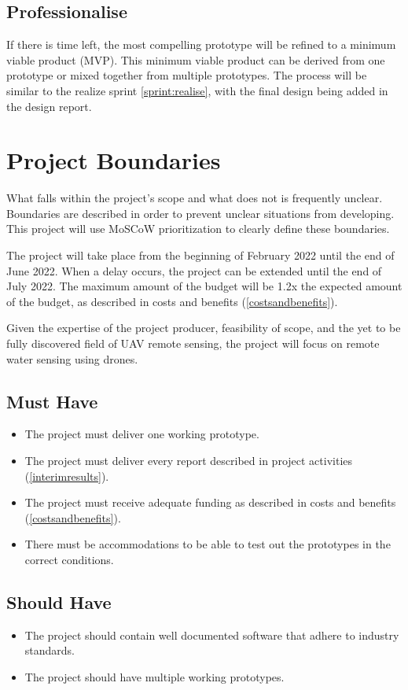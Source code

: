 \documentclass[11pt, a4paper]{article}
\begin{document}
\subsection{Professionalise} \label{sprint:professionalise}
If there is time left, the most compelling prototype will be refined to a minimum viable product (MVP). \cite{mvp} This minimum viable product can be derived from one prototype or mixed together from multiple prototypes. The process will be similar to the realize sprint \ref{sprint:realise}, with the final design being added in the design report.

\section{Project Boundaries} \label{projectboundaries}
What falls within the project’s scope and what does not is frequently  unclear. Boundaries are described in order to prevent unclear situations from developing. This project will use MoSCoW prioritization to clearly define these boundaries. \cite{moscow}

The project will take place from the beginning of February 2022 until the end of June 2022. When a delay occurs, the project can be extended until the end of July 2022. The maximum amount of the budget will be 1.2x the expected amount of the budget, as described in costs and benefits (\ref{costsandbenefits}). 

Given the expertise of the project producer, feasibility of scope, and the yet to be fully discovered field of UAV remote sensing, the project will focus on remote water sensing using drones.

\subsection{Must Have}
\begin{itemize}
  \item The project must deliver one working prototype.
  \item The project must deliver every report described in project activities (\ref{interimresults}).
  \item The project must receive adequate funding as described in costs and benefits (\ref{costsandbenefits}).
  \item There must be accommodations to be able to test out the prototypes in the correct conditions.
\end{itemize}
\subsection{Should Have}
\begin{itemize}
  \item The project should contain well documented software that adhere to industry standards.
  \item The project should have multiple working prototypes.
\end{itemize}
\end{document}
